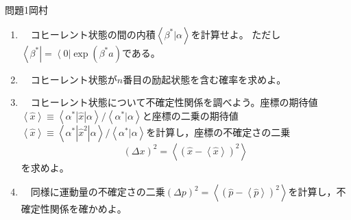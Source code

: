 \documentclass[fleqn]{jbook}
\begin{document}
\begin{question}{問題1}{岡村}
\begin{enumerate}
\begin{enumerate}
    \item 　コヒーレント状態の間の内積$\left\langle {\beta ^ *}|{\alpha} \right\rangle $を計算せよ。
 ただし$\left\langle {\beta ^ *  } \right| = \left\langle 0 \right|\exp \left( {\beta ^ *  a} \right)$である。\\
    
    \item 　コヒーレント状態が$n$番目の励起状態を含む確率を求めよ。\\
    
    \item 　コヒーレント状態について不確定性関係を調べよう。座標の期待値$\left\langle {\hat x} \right\rangle  \equiv \left\langle {{\alpha ^ *}\left| {\hat x} \right|{\alpha}} \right\rangle / \left\langle {\alpha ^ *}|{\alpha} \right\rangle $と座標の二乗の期待値$\left\langle {\hat x} \right\rangle  \equiv \left\langle {{\alpha ^ *}\left| {\hat x^2} \right|{\alpha}} \right\rangle / \left\langle {\alpha ^ *}|{\alpha} \right\rangle $を計算し，座標の不確定さの二乗
 \begin{equation}
\left( {\Delta x} \right)^2  = \left\langle {\left( {\hat x - \left\langle {\hat x} \right\rangle } \right)^2 } \right\rangle 
 \end{equation}
 を求めよ。\\
    
    \item 　同様に運動量の不確定さの二乗$\left( {\Delta p} \right)^2  = \left\langle {\left( {\hat p - \left\langle {\hat p} \right\rangle } \right)^2 } \right\rangle $を計算し，不確定性関係を確かめよ。\\
  \end{enumerate}
  
\end{enumerate}

\end{question}

\end{document}
